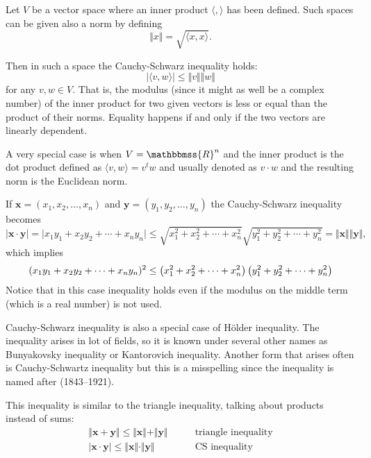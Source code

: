 \documentclass{article}
\newcommand{\R}{\mathbbmss{R}}
\begin{document}
Let $V$ be a vector space where an inner product $\langle,\rangle$ has been defined.
Such spaces can be given also a norm by defining 
\[
\Vert x\Vert = \sqrt{\langle x,x\rangle}.
\]

Then in such a space the Cauchy-Schwarz inequality holds:
\[
\vert \langle v,w\rangle\vert\le \Vert v\Vert\Vert w\Vert
\]
for any $v,w\in V$. That is, the modulus (since it might as well be a complex number) of the inner product for two given vectors is less or equal than the product of their norms. Equality happens if and only if the two vectors are linearly dependent.


A very special case is when $V=\R^n$ and the inner product is the dot product defined as $\langle v,w\rangle  = v^t w$ and usually denoted as $v\cdot w$ and the resulting norm is the Euclidean norm.

If $\mathbf{x}=(x_1,x_2,\ldots,x_n)$ and $\mathbf{y}=(y_1,y_2,\ldots,y_n)$ the Cauchy-Schwarz inequality becomes
\[
\vert \mathbf{x}\cdot \mathbf{y}\vert=\vert x_1y_1+x_2y_2+\cdots+x_ny_n\vert \le
\sqrt{x_1^2+x_2^2+\cdots+x_n^2}\sqrt{y_1^2+y_2^2+\cdots+y_n^2}=\Vert \mathbf{x}\Vert\Vert \mathbf{y} \Vert,\]
which implies
\[
(x_1y_1+x_2y_2+\cdots+x_ny_n)\sp2 \le\left(x_1^2+x_2^2+\cdots+x_n^2\right)\left( y_1^2+y_2^2+\cdots+y_n^2\right)
\]
Notice that in this case inequality holds even if the modulus on the middle term (which is a real number) is not used.

Cauchy-Schwarz inequality is also a special case of H\"older inequality.
The inequality arises in lot of fields, so it is known under several other names as 
Bunyakovsky inequality or Kantorovich inequality. Another form that arises often is Cauchy-Schwartz inequality but this is a misspelling since the inequality is named after  (1843--1921).

This inequality is similar to the triangle inequality, talking about products instead of sums:
\begin{align*}
\Vert\mathbf{x}+\mathbf{y}\Vert\leq\Vert \mathbf{x}\Vert+\Vert \mathbf{y}\Vert & \qquad\text{triangle inequality}\\
\vert\mathbf{x}\cdot\mathbf{y}\vert\leq\Vert \mathbf{x}\Vert\cdot\Vert \mathbf{y}\Vert &\qquad \text{CS inequality}\\
\end{align*}
\end{document}
